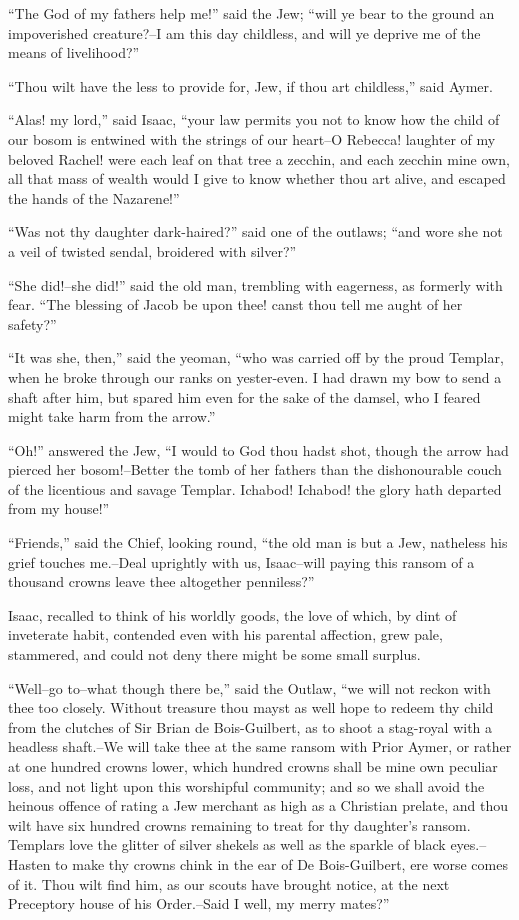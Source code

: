 ``The God of my fathers help me!'' said the Jew; ``will ye bear to the
ground an impoverished creature?--I am this day childless, and will ye
deprive me of the means of livelihood?''

``Thou wilt have the less to provide for, Jew, if thou art childless,''
said Aymer.

``Alas! my lord,'' said Isaac, ``your law permits you not to know how
the child of our bosom is entwined with the strings of our heart--O
Rebecca! laughter of my beloved Rachel! were each leaf on that tree a
zecchin, and each zecchin mine own, all that mass of wealth would I give
to know whether thou art alive, and escaped the hands of the Nazarene!''

``Was not thy daughter dark-haired?'' said one of the outlaws; ``and
wore she not a veil of twisted sendal, broidered with silver?''

``She did!--she did!'' said the old man, trembling with eagerness, as
formerly with fear. ``The blessing of Jacob be upon thee! canst thou
tell me aught of her safety?''

``It was she, then,'' said the yeoman, ``who was carried off by the
proud Templar, when he broke through our ranks on yester-even. I had
drawn my bow to send a shaft after him, but spared him even for the sake
of the damsel, who I feared might take harm from the arrow.''

``Oh!'' answered the Jew, ``I would to God thou hadst shot, though the
arrow had pierced her bosom!--Better the tomb of her fathers than the
dishonourable couch of the licentious and savage Templar. Ichabod!
Ichabod! the glory hath departed from my house!''

``Friends,'' said the Chief, looking round, ``the old man is but a Jew,
natheless his grief touches me.--Deal uprightly with us, Isaac--will
paying this ransom of a thousand crowns leave thee altogether
penniless?''

Isaac, recalled to think of his worldly goods, the love of which, by
dint of inveterate habit, contended even with his parental affection,
grew pale, stammered, and could not deny there might be some small
surplus.

``Well--go to--what though there be,'' said the Outlaw, ``we will not
reckon with thee too closely. Without treasure thou mayst as well hope
to redeem thy child from the clutches of Sir Brian de Bois-Guilbert, as
to shoot a stag-royal with a headless shaft.--We will take thee at the
same ransom with Prior Aymer, or rather at one hundred crowns lower,
which hundred crowns shall be mine own peculiar loss, and not light upon
this worshipful community; and so we shall avoid the heinous offence of
rating a Jew merchant as high as a Christian prelate, and thou wilt have
six hundred crowns remaining to treat for thy daughter's ransom.
Templars love the glitter of silver shekels as well as the sparkle of
black eyes.--Hasten to make thy crowns chink in the ear of De
Bois-Guilbert, ere worse comes of it. Thou wilt find him, as our scouts
have brought notice, at the next Preceptory house of his Order.--Said I
well, my merry mates?''

